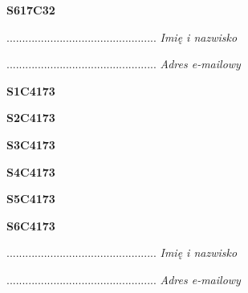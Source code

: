\begin{turn}{90}\huge \textbf{S617C32}\end{turn}

\begin{turn}{90}\begin{minipage}{\linewidth} \vspace{20mm} ................................................  \textit{Imię i nazwisko}\end{minipage}\end{turn}

\begin{turn}{90}\begin{minipage}{\linewidth} \vspace{20mm} ................................................  \textit{Adres e-mailowy}\end{minipage}\end{turn}

\begin{turn}{90}\huge \textbf{S1C4173}\end{turn}

\begin{turn}{90}\huge \textbf{S2C4173}\end{turn}

\begin{turn}{90}\huge \textbf{S3C4173}\end{turn}

\begin{turn}{90}\huge \textbf{S4C4173}\end{turn}

\begin{turn}{90}\huge \textbf{S5C4173}\end{turn}

\begin{turn}{90}\huge \textbf{S6C4173}\end{turn}

\begin{turn}{90}\begin{minipage}{\linewidth} \vspace{20mm} ................................................  \textit{Imię i nazwisko}\end{minipage}\end{turn}

\begin{turn}{90}\begin{minipage}{\linewidth} \vspace{20mm} ................................................  \textit{Adres e-mailowy}\end{minipage}\end{turn}

